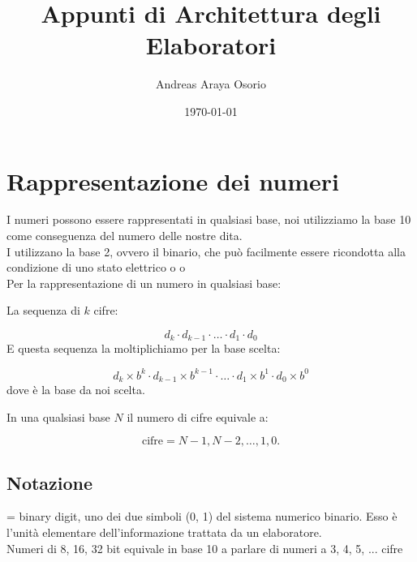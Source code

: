 \documentclass[12pt, a4paper]{article}
\title{Appunti di Architettura degli Elaboratori}
\author{Andreas Araya Osorio}
\date{\today}
\begin{document}
\maketitle

\tableofcontents


\section{Rappresentazione dei numeri}

I numeri possono essere rappresentati in qualsiasi base, noi utilizziamo la base
10 come conseguenza del numero delle nostre dita.\\
I  utilizzano la base 2, ovvero il binario, che può facilmente
essere ricondotta alla condizione di uno stato elettrico
o  o \\
Per la rappresentazione di un numero in qualsiasi base:
\begin{defn}
La sequenza di $k$ cifre:

\begin{equation}
	d_k \cdot d_{k-1} \cdot \dots \cdot d_1 \cdot d_0
\end{equation}
E questa sequenza la moltiplichiamo per la base scelta:

\begin{equation}
	d_k \times b^k \cdot d_{k-1} \times b^{k-1} \cdot 
	\dots \cdot d_1 \times b^1 \cdot d_0 \times b^0
\end{equation}
dove  è la base da noi scelta.
\end{defn}

\begin{defn}
In una qualsiasi base $N$ il numero di cifre equivale a:


\begin{equation}
	\mbox{cifre} = N - 1, N - 2, \dots, 1, 0.
\end{equation}
\end{defn}

\subsection{Notazione}
\begin{defn}[BIT]
 = binary digit, uno dei due simboli (0, 1) del sistema numerico binario.
Esso è l'unità elementare dell'informazione trattata da un elaboratore.\\
Numeri di 8, 16, 32 bit equivale in base 10 
a parlare di numeri a 3, 4, 5, ... cifre \\
\end{defn}
\end{document}
